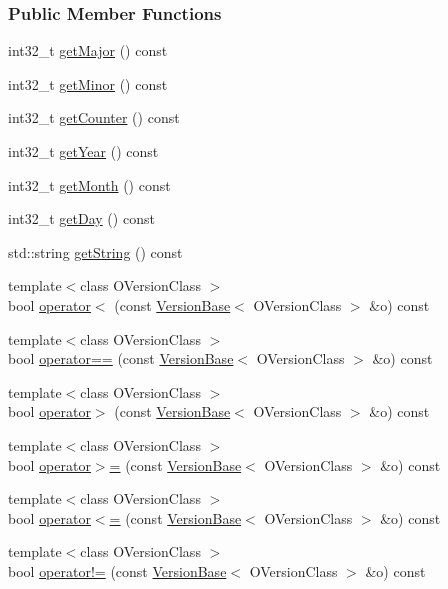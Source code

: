 \subsubsection*{Public Member Functions}
\begin{DoxyCompactItemize}
\item 
int32\+\_\+t \hyperlink{a00079_a87db56a6b48379927ea2c34053ad11d8}{get\+Major} () const 
\item 
int32\+\_\+t \hyperlink{a00079_a9e3c537a417ce0bfbcc6758ad5ae5cb5}{get\+Minor} () const 
\item 
int32\+\_\+t \hyperlink{a00079_a22329ec00668f53aaf4a4efc68d49f93}{get\+Counter} () const 
\item 
int32\+\_\+t \hyperlink{a00079_af8f407400b6b4994c1cd3b243ef84b05}{get\+Year} () const 
\item 
int32\+\_\+t \hyperlink{a00079_a4a3f44823b8caa24943a954385184de2}{get\+Month} () const 
\item 
int32\+\_\+t \hyperlink{a00079_a05c80a133cb8aa10d1c18088f163c206}{get\+Day} () const 
\item 
std\+::string \hyperlink{a00079_aa0b506e6d23023c3efd3a312a39a336d}{get\+String} () const 
\item 
{\footnotesize template$<$class O\+Version\+Class $>$ }\\bool \hyperlink{a00079_a92759ed17bf0e3976ba1bf846b7e21c9}{operator$<$} (const \hyperlink{a00079}{Version\+Base}$<$ O\+Version\+Class $>$ \&o) const 
\item 
{\footnotesize template$<$class O\+Version\+Class $>$ }\\bool \hyperlink{a00079_a4225f1bc4cbcf482bfe688cf0a60fc21}{operator==} (const \hyperlink{a00079}{Version\+Base}$<$ O\+Version\+Class $>$ \&o) const 
\item 
{\footnotesize template$<$class O\+Version\+Class $>$ }\\bool \hyperlink{a00079_a4bff2ae98a2d5883e6dbab5833a51cd7}{operator$>$} (const \hyperlink{a00079}{Version\+Base}$<$ O\+Version\+Class $>$ \&o) const 
\item 
{\footnotesize template$<$class O\+Version\+Class $>$ }\\bool \hyperlink{a00079_a564b9166e177e8657f87f19447aea0cf}{operator$>$=} (const \hyperlink{a00079}{Version\+Base}$<$ O\+Version\+Class $>$ \&o) const 
\item 
{\footnotesize template$<$class O\+Version\+Class $>$ }\\bool \hyperlink{a00079_abd9cbd90f53ff3b5304588349c1b4b7c}{operator$<$=} (const \hyperlink{a00079}{Version\+Base}$<$ O\+Version\+Class $>$ \&o) const 
\item 
{\footnotesize template$<$class O\+Version\+Class $>$ }\\bool \hyperlink{a00079_a87adeb21177fa070dd7fc6a9ffbda5b2}{operator!=} (const \hyperlink{a00079}{Version\+Base}$<$ O\+Version\+Class $>$ \&o) const 
\end{DoxyCompactItemize}
